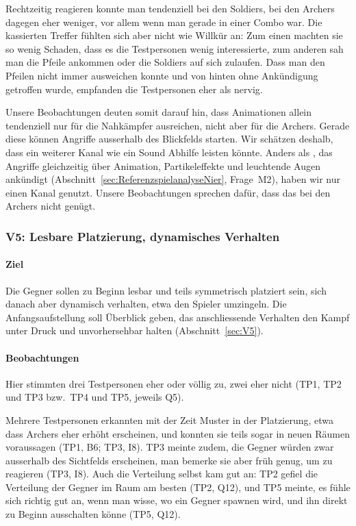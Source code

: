 \documentclass[../Main.tex]{subfiles}
\begin{document}
Rechtzeitig reagieren konnte man tendenziell bei den Soldiers, bei den Archers dagegen eher weniger, vor allem wenn man gerade in einer Combo war. Die kassierten Treffer fühlten sich aber nicht wie Willkür an: Zum einen machten sie so wenig Schaden, dass es die Testpersonen wenig interessierte, zum anderen sah man die Pfeile ankommen oder die Soldiers auf sich zulaufen. Dass man den Pfeilen nicht immer ausweichen konnte und von hinten ohne Ankündigung getroffen wurde, empfanden die Testpersonen eher als nervig.

Unsere Beobachtungen deuten somit darauf hin, dass Animationen allein tendenziell nur für die Nahkämpfer ausreichen, nicht aber für die Archers. Gerade diese können Angriffe ausserhalb des Blickfelds starten. Wir schätzen deshalb, dass ein weiterer Kanal wie ein Sound Abhilfe leisten könnte. Anders als , das Angriffe gleichzeitig über Animation, Partikeleffekte und leuchtende Augen ankündigt (Abschnitt~\ref{sec:ReferenzspielanalyseNier}, Frage~M2), haben wir nur einen Kanal genutzt. Unsere Beobachtungen sprechen dafür, dass das bei den Archers nicht genügt.

\subsubsection{V5: Lesbare Platzierung, dynamisches Verhalten}

\paragraph{Ziel}
Die Gegner sollen zu Beginn lesbar und teils symmetrisch platziert sein, sich danach aber dynamisch verhalten, etwa den Spieler umzingeln. Die Anfangsaufstellung soll Überblick geben, das anschliessende Verhalten den Kampf unter Druck und unvorhersehbar halten (Abschnitt~\ref{sec:V5}).

\paragraph{Beobachtungen}
Hier stimmten drei Testpersonen eher oder völlig zu, zwei eher nicht (TP1, TP2 und TP3 bzw.\ TP4 und TP5, jeweils Q5).

Mehrere Testpersonen erkannten mit der Zeit Muster in der Platzierung, etwa dass Archers eher erhöht erscheinen, und konnten sie teils sogar in neuen Räumen voraussagen (TP1, B6; TP3, I8). TP3 meinte zudem, die Gegner würden zwar ausserhalb des Sichtfelds erscheinen, man bemerke sie aber früh genug, um zu reagieren (TP3, I8). Auch die Verteilung selbst kam gut an: TP2 gefiel die Verteilung der Gegner im Raum am besten (TP2, Q12), und TP5 meinte, es fühle sich richtig gut an, wenn man wisse, wo ein Gegner spawnen wird, und ihn direkt zu Beginn ausschalten könne (TP5, Q12).
\end{document}
